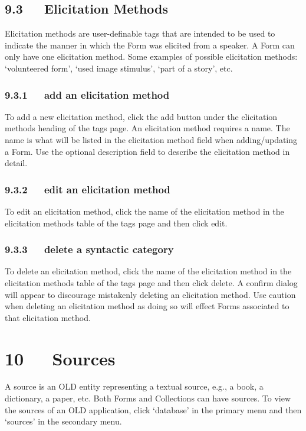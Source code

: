 \documentclass[letterpaper,10pt,english]{sphinxmanual}
\begin{document}
\section{9.3   Elicitation Methods}
\label{user_guide:elicitation-methods}
Elicitation methods are user-definable tags that are intended to be used to
indicate the manner in which the Form was elicited from a speaker.  A Form can
only have one elicitation method.  Some examples of possible elicitation
methods: `volunteered form', `used image stimulus', `part of a story', etc.


\subsection{9.3.1   add an elicitation method}
\label{user_guide:add-an-elicitation-method}
To add a new elicitation method, click the add button under the elicitation
methods heading of the tags page.  An elicitation method requires a name.  The
name is what will be listed in the elicitation method field when adding/updating
a Form.  Use the optional description field to describe the elicitation method
in detail.


\subsection{9.3.2   edit an elicitation method}
\label{user_guide:edit-an-elicitation-method}
To edit an elicitation method, click the name of the elicitation method in the
elicitation methods table of the tags page and then click edit.


\subsection{9.3.3   delete a syntactic category}
\label{user_guide:id21}
To delete an elicitation method, click the name of the elicitation method in the
elicitation methods table of the tags page and then click delete.  A confirm
dialog will appear to discourage mistakenly deleting an elicitation method.  Use
caution when deleting an elicitation method as doing so will effect Forms
associated to that elicitation method.


\chapter{10   Sources}
\label{user_guide:sources}
A source is an OLD entity representing a textual source, e.g., a book, a
dictionary, a paper, etc.  Both Forms and Collections can have sources.  To view
the sources of an OLD application, click `database' in the primary menu and then
`sources' in the secondary menu.
\end{document}
